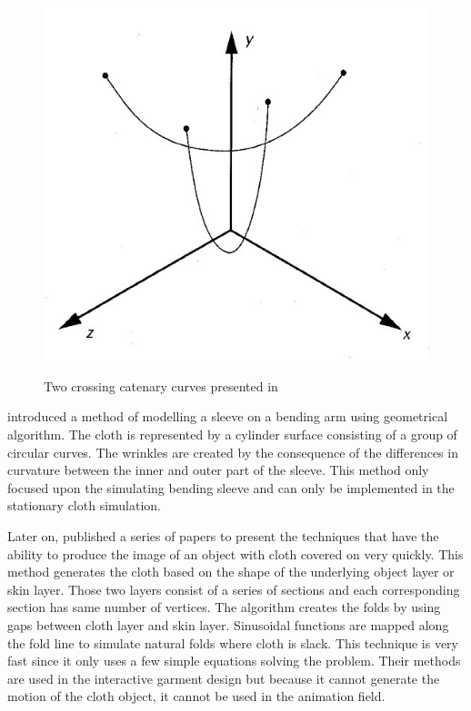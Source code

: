 \begin{figure}[ht]
    \centering
	\includegraphics[width=0.7\columnwidth]{../images/weil1986}\\[1cm]
    \caption{Two crossing catenary curves presented in \cite{Weil:1986}}
    \label{figure:weil}
\end{figure}

\cite{agui1990} introduced a method of modelling a sleeve on a bending arm using geometrical algorithm. The cloth is represented by a cylinder surface consisting of a group of circular curves. The wrinkles are created by the consequence of the differences in curvature between the inner and outer part of the sleeve. This method only focused upon the simulating bending sleeve and can only be implemented in the stationary cloth simulation. 

Later on, \cite{Hinds1990} published a series of papers to present the techniques that have the ability to produce the image of an object with cloth covered on very quickly. This method generates the cloth based on the shape of the underlying object layer or skin layer. Those two layers consist of a series of sections and each corresponding section has same number of vertices. The algorithm creates the folds by using gaps between cloth layer and skin layer. Sinusoidal functions are mapped along the fold line to simulate natural folds where cloth is slack. This technique is very fast since it only uses a few simple equations solving the problem. Their methods are used in the interactive garment design but because it cannot generate the motion of the cloth object, it cannot be used in the animation field.

